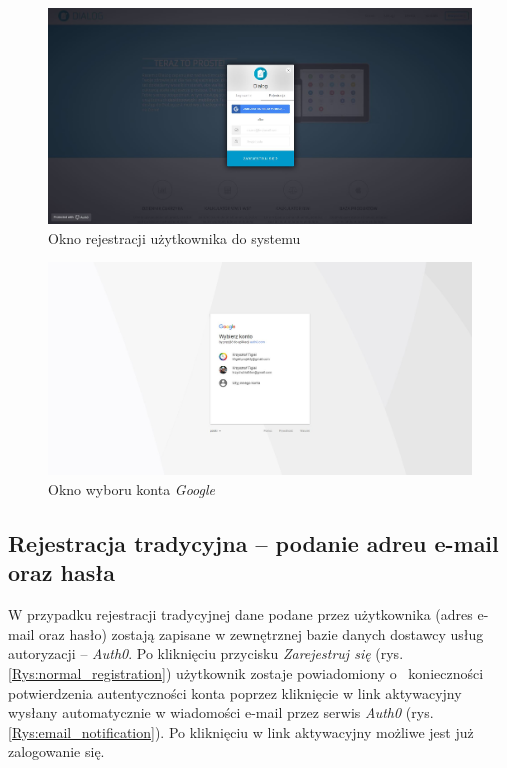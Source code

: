 \newpage

\begin{figure}[h]
	\centering\includegraphics[scale=0.3]{images/register.jpg}
	\caption{Okno rejestracji użytkownika do systemu}
	\label{Rys:register}
\end{figure}

\begin{figure}[h]
	\centering\includegraphics[scale=0.3]{images/google_account.jpg}
	\caption{Okno wyboru konta \textit{Google}}
	\label{Rys:choose_google}
\end{figure}

\subsection{Rejestracja tradycyjna -- podanie adreu e-mail oraz hasła}
W przypadku rejestracji tradycyjnej dane podane przez użytkownika (adres e-mail oraz hasło) zostają zapisane w zewnętrznej bazie danych dostawcy usług autoryzacji -- \textit{Auth0}. Po kliknięciu przycisku \textit{Zarejestruj się} (rys. \ref{Rys:normal_registration}) użytkownik zostaje powiadomiony o~ konieczności potwierdzenia autentyczności konta poprzez kliknięcie w link aktywacyjny wysłany automatycznie w wiadomości e-mail przez serwis \textit{Auth0} (rys. \ref{Rys:email_notification}). Po kliknięciu w link aktywacyjny możliwe jest już zalogowanie się. 


